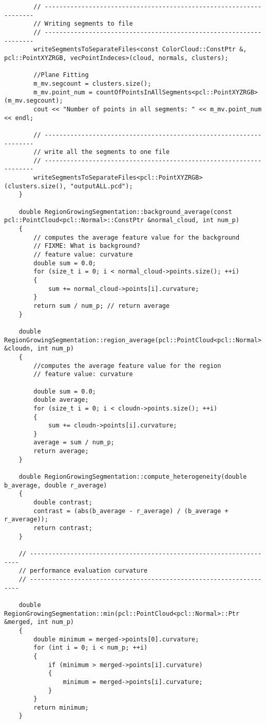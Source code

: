 \begin{lstlisting}
		// -------------------------------------------------------------------
		// Writing segments to file
		// -------------------------------------------------------------------
		writeSegmentsToSeparateFiles<const ColorCloud::ConstPtr &, pcl::PointXYZRGB, vecPointIndeces>(cloud, normals, clusters);

		//Plane Fitting
		m_mv.segcount = clusters.size();
		m_mv.point_num = countOfPointsInAllSegments<pcl::PointXYZRGB>(m_mv.segcount);
		cout << "Number of points in all segments: " << m_mv.point_num << endl;

		// -------------------------------------------------------------------
		// write all the segments to one file
		// -------------------------------------------------------------------
		writeSegmentsToSeparateFiles<pcl::PointXYZRGB>(clusters.size(), "outputALL.pcd");
	}

	double RegionGrowingSegmentation::background_average(const pcl::PointCloud<pcl::Normal>::ConstPtr &normal_cloud, int num_p)
	{
		// computes the average feature value for the background
		// FIXME: What is background?
		// feature value: curvature
		double sum = 0.0;
		for (size_t i = 0; i < normal_cloud->points.size(); ++i)
		{
			sum += normal_cloud->points[i].curvature;
		}
		return sum / num_p; // return average
	}

	double RegionGrowingSegmentation::region_average(pcl::PointCloud<pcl::Normal>::Ptr &cloudn, int num_p)
	{
		//computes the average feature value for the region
		// feature value: curvature

		double sum = 0.0;
		double average;
		for (size_t i = 0; i < cloudn->points.size(); ++i)
		{
			sum += cloudn->points[i].curvature;
		}
		average = sum / num_p;
		return average;
	}

	double RegionGrowingSegmentation::compute_heterogeneity(double b_average, double r_average)
	{
		double contrast;
		contrast = (abs(b_average - r_average) / (b_average + r_average));
		return contrast;
	}

	// -------------------------------------------------------------------
	// performance evaluation curvature
	// -------------------------------------------------------------------

	double RegionGrowingSegmentation::min(pcl::PointCloud<pcl::Normal>::Ptr &merged, int num_p)
	{
		double minimum = merged->points[0].curvature;
		for (int i = 0; i < num_p; ++i)
		{
			if (minimum > merged->points[i].curvature)
			{
				minimum = merged->points[i].curvature;
			}
		}
		return minimum;
	}


\end{lstlisting}
